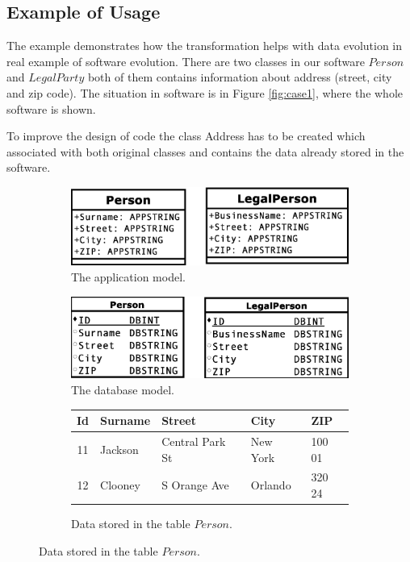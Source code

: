 \documentclass[runningheads]{comsis}
\begin{document}
\subsection{Example of Usage}
The example demonstrates how the transformation helps with data evolution in real example of software evolution. There are two classes in our software $Person$ and $LegalParty$ both of them contains information about address (street, city and zip code). The situation in software is in Figure \ref{fig:case1}, where the whole software is shown. 

To improve the design of code the class Address has to be created which associated with both original classes and contains the data already stored in the software. 
\begin{figure}
\begin{subfigure}[b]{0.45\textwidth}
	\includegraphics[width=\textwidth]{./images/case_app_1}
	\caption{The application model.}
\end{subfigure}
\quad
\begin{subfigure}[b]{0.45\textwidth}
	\includegraphics[width=\textwidth]{./images/case_db_1}
	\caption{The database model.}
\end{subfigure}
\begin{subfigure}[b]{\textwidth}
	\centering
	\begin{tabular}{| c | l | l | l | l | }
	 	\hline
		Id &  Surname & Street & City & ZIP  \\ \hline  
		11 & Jackson & Central Park St & New York & 100 01  \\ \hline
		12 & Clooney & S Orange Ave & Orlando & 320 24  \\ \hline
	\end{tabular}
	\caption{Data stored in the table $Person$.}

\end{subfigure}
\end{figure}
\end{document}
